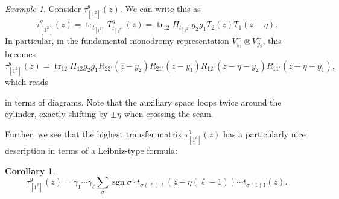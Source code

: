 \documentclass[11pt]{report}
\newtheorem{corollary}[theorem]{Corollary}
\theoremstyle{definition}
\theoremstyle{remark}
\theoremstyle{remark}
\newtheorem*{example}{Example}
\begin{document}
\begin{example}
Consider $\tau_{[1^2]}^g(z)$. We can write this as
\begin{equation*}
\tau_{[1^2]}^g(z) = \operatorname{tr}_{t_{[1^2]}} T_{t_{[1^2]}}^g(z) = \operatorname{tr}_{12} \Pi_{t_{[1^2]}} g_2 g_1 T_2(z) T_1(z-\eta).
\end{equation*}
In particular, in the fundamental monodromy representation $V_{y_1}^+ \otimes V_{y_2}^+$, this becomes
\begin{equation*}
\tau_{[1^2]}^g(z) = \operatorname{tr}_{12} \Pi_{12}^- g_2 g_1 R_{22'}(z-y_2) R_{21'}(z-y_1) R_{12'}(z-\eta-y_2) R_{11'}(z-\eta-y_1),
\end{equation*}
which reads
~\\
\begin{center}
\end{center}
in terms of diagrams. Note that the auxiliary space loops twice around the cylinder, exactly shifting by $\pm \eta$ when crossing the seam.
\end{example}

Further, we see that the highest transfer matrix $\tau_{[1^\ell]}^g(z)$ has a particularly nice description in terms of a Leibniz-type formula:

\begin{corollary}
\begin{equation*}
\tau_{[1^\ell]}^g(z) = \gamma_1 \cdots \gamma_\ell \sum_\sigma \operatorname{sgn} \sigma \cdot t_{\sigma(\ell)\ell}(z-\eta (\ell-1)) \cdots t_{\sigma(1)1}(z).
\end{equation*}
\end{corollary}
\end{document}
